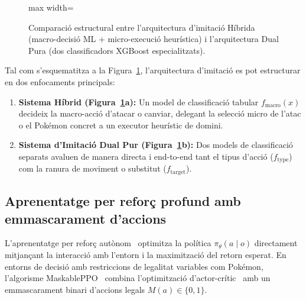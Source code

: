 \begin{figure}[htbp]
\begin{adjustbox}{max width=\linewidth}
    \end{adjustbox}
    \caption{Comparació estructural entre l'arquitectura d'imitació Híbrida (macro-decisió ML + micro-execució heurística) i l'arquitectura Dual Pura (dos classificadors XGBoost especialitzats).}
    \label{fig:il_architectures}
\end{figure}

Tal com s'esquematitza a la Figura~\ref{fig:il_architectures}, l'arquitectura d'imitació es pot estructurar en dos enfocaments principals:
\begin{enumerate}
    \item \textbf{Sistema Híbrid (Figura~\ref{fig:il_architectures}a):} Un model de classificació tabular $f_{\text{macro}}(x)$ decideix la macro-acció d'atacar o canviar, delegant la selecció micro de l'atac o el Pokémon concret a un executor heurístic de domini.
    \item \textbf{Sistema d'Imitació Dual Pur (Figura~\ref{fig:il_architectures}b):} Dos models de classificació separats avaluen de manera directa i end-to-end tant el tipus d'acció ($f_{\text{type}}$) com la ranura de moviment o substitut ($f_{\text{target}}$).
\end{enumerate}

\subsection{Aprenentatge per reforç profund amb emmascarament d'accions}
\label{subsec:teoria_drl}

L'aprenentatge per reforç autònom~\cite{sutton_barto} optimitza la política $\pi_\theta(a \mid o)$ directament mitjançant la interacció amb l'entorn i la maximització del retorn esperat. En entorns de decisió amb restriccions de legalitat variables com Pokémon, l'algorisme MaskablePPO~\cite{ppo, huang_action_masking} combina l'optimització d'actor-crític~\cite{konda_actor_critic} amb un emmascarament binari d'accions legals $M(a) \in \{0, 1\}$.

